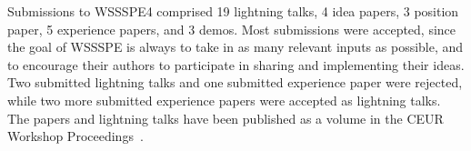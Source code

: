 \documentclass[11pt, oneside]{amsart}
\begin{document}
%
%
%
%
%
%
%
%
%

Submissions to WSSSPE4 comprised
19 lightning talks,
4 idea papers,
3 position paper,
5 experience papers,
and
3 demos.
Most submissions were accepted, since the goal of WSSSPE is always to
take in as many relevant inputs as possible, and to encourage their authors to
participate in sharing and implementing their ideas. Two submitted lightning talks and one submitted experience paper were rejected, while two more submitted experience papers
were accepted as lightning talks.
%
The papers and lightning talks have been published as a volume in the CEUR Workshop Proceedings~\cite{WSSSPE4-proceedings}.
\end{document}
